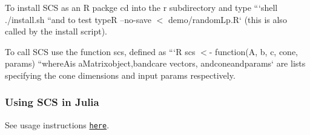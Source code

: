 To install S\-C\-S as an R packge cd into the {\ttfamily r} subdirectory and type ```shell ./install.sh ``{\ttfamily  and to test type}R --no-\/save $<$ demo/random\-Lp.\-R` (this is also called by the install script).

To call S\-C\-S use the function {\ttfamily scs}, defined as ```\-R scs $<$-\/ function(\-A, b, c, cone, params) ``{\ttfamily  where}A{\ttfamily is a}Matrix{\ttfamily object,}b{\ttfamily and}c{\ttfamily are vectors, and}cone{\ttfamily and}params` are lists specifying the cone dimensions and input params respectively.

\subsubsection*{Using S\-C\-S in Julia}

See usage instructions \href{https://github.com/JuliaOpt/SCS.jl}{\tt here}. 